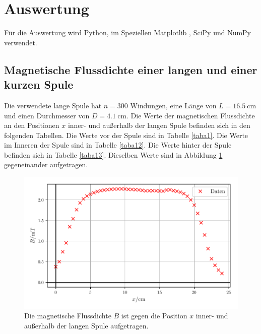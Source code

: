 \section{Auswertung}
\label{sec:Auswertung}

Für die Auswertung wird Python, im Speziellen Matplotlib \cite{matplotlib}, 
SciPy \cite{scipy} und NumPy \cite{numpy} verwendet.

\subsection{Magnetische Flussdichte einer langen und einer kurzen Spule}
Die verwendete lange Spule hat $n = \num{300}$ Windungen, eine Länge%
von $L = \SI{16.5}{\centi\meter}$ und einen Durchmesser von
$D = \SI{4.1}{\centi\meter}$.
Die Werte der magnetischen Flussdichte an den Positionen $x$ inner- und außerhalb
der langen Spule befinden sich in den folgenden Tabellen.
Die Werte vor der Spule sind in Tabelle \ref{taba1}. Die Werte im Inneren
der Spule sind in Tabelle \ref{taba12}. Die Werte hinter der Spule befinden
sich in Tabelle \ref{taba13}. %
Dieselben Werte sind in Abbildung \ref{plota1} gegeneinander aufgetragen.




\begin{figure}
    \centering
    \includegraphics{build/plota1.pdf}
    \caption{Die magnetische Flussdichte $B$ ist gegen die Position $x$ inner- 
    und außerhalb der langen Spule aufgetragen.}
    \label{plota1}
\end{figure}

